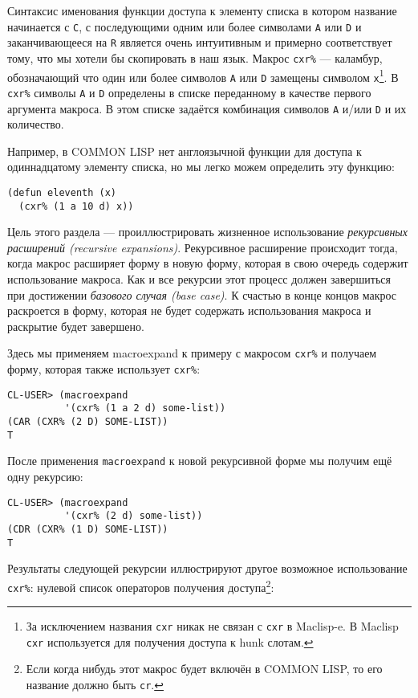 Синтаксис именования функции доступа к элементу списка в котором название начинается с \verb"C", с последующими одним или более символами \verb"A" или \verb"D" и заканчивающееся на \verb"R" является очень интуитивным и примерно соответствует тому, что мы хотели бы скопировать в наш язык. Макрос \verb"cxr%" --- каламбур, обозначающий что один или более символов \verb"A" или \verb"D" замещены символом \verb"x"\footnote{За исключением названия \verb"cxr" никак не связан с \verb"cxr" в Maclisp-e. В Maclisp \verb"cxr" используется для получения доступа к hunk слотам.}. В \verb"cxr%" символы \verb"A" и \verb"D" определены в списке переданному в качестве первого аргумента макроса. В этом списке задаётся комбинация символов \verb"A" и/или \verb"D" и их количество.



Например, в COMMON LISP нет англоязычной функции для доступа к одиннадцатому элементу списка, но мы легко можем определить эту функцию:

\begin{verbatim}
(defun eleventh (x)
  (cxr% (1 a 10 d) x))
\end{verbatim}

Цель этого раздела --- проиллюстрировать жизненное использование \emph{рекурсивных расширений (recursive expansions)}. Рекурсивное расширение происходит тогда, когда макрос расширяет форму в новую форму, которая в свою очередь содержит использование макроса. Как и все рекурсии этот процесс должен завершиться при достижении \emph{базового случая (base case)}. К счастью в конце концов макрос раскроется в форму, которая не будет содержать использования макроса и раскрытие будет завершено.

Здесь мы применяем macroexpand к примеру с макросом \verb"cxr%" и получаем форму, которая также использует \verb"cxr%":

\begin{verbatim}
CL-USER> (macroexpand
          '(cxr% (1 a 2 d) some-list))
(CAR (CXR% (2 D) SOME-LIST))
T
\end{verbatim}

После применения \verb"macroexpand" к новой рекурсивной форме мы получим ещё одну рекурсию:

\begin{verbatim}
CL-USER> (macroexpand
          '(cxr% (2 d) some-list))
(CDR (CXR% (1 D) SOME-LIST))
T
\end{verbatim}

Результаты следующей рекурсии иллюстрируют другое возможное использование \verb"cxr%": нулевой список операторов получения доступа\footnote{Если когда нибудь этот макрос будет включён в COMMON LISP, то его название должно быть \verb"cr".}:



